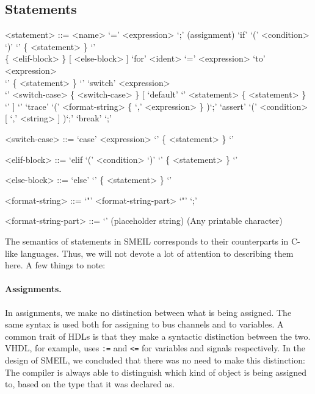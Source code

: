 \subsection{Statements}
\begin{grammar}
  <statement> ::= <name> `=' <expression> `;' (assignment)
  \alt `if' `(' <condition> `)' `{' \{ <statement> \} `}' \\ \{ <elif-block>
    \} [ <else-block> ]
  \alt `for' <ident> `=' <expression> `to' <expression> \\ `{' \{ <statement> \} `}'
  \alt `switch' <expression> \\ `{' <switch-case> \{ <switch-case> \}
  [ `default' `{' <statement> \{ <statement> \} `}' ] `}'
  \alt `trace' `(' <format-string> \{ `,' <expression> \} )`;'
  \alt `assert' `(' <condition> [ `,' <string> ] )`;'
  \alt `break' `;'

  <switch-case> ::= `case' <expression> `{' \{ <statement> \} `}'

  <elif-block> ::= `elif `(' <condition> `)' `{' \{ <statement> \} `}'

  <else-block> ::= `else' `{' \{ <statement> \} `}'

  <format-string> ::= `"' { <format-string-part> } `"' `;'
  
  <format-string-part> ::= `{}' (placeholder string)
   (Any printable character)
\end{grammar}

The semantics of statements in SMEIL corresponds to their counterparts in C-like
languages. Thus, we will not devote a lot of attention to describing them
here. A few things to note:

\paragraph{Assignments.} In assignments, we make no distinction between what is
being assigned. The same syntax is used both for assigning to bus channels and
to variables. A common trait of HDLs is that they make a syntactic distinction
between the two. VHDL, for example, uses \texttt{:=} and \texttt{<=} for
variables and signals respectively. In the design of SMEIL, we concluded that
there was no need to make this distinction: The compiler is always able to
distinguish which kind of object is being assigned to, based on the type that it
was declared as.


